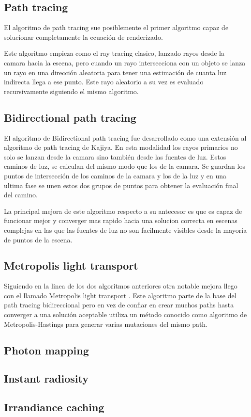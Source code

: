 \clearpage

\subsection{Path tracing}

El algoritmo de path tracing \cite{Kajiya1986} sue posiblemente el primer algoritmo capaz de solucionar completamente la ecuación de renderizado.

\medskip
Este algoritmo empieza como el ray tracing clasico, lanzado rayos desde la camara hacia la escena, pero cuando un rayo intersecciona con un objeto se lanza un rayo en una dirección aleatoria para tener una estimación de cuanta luz indirecta llega a ese punto. Este rayo aleatorio a su vez es evaluado recursivamente siguiendo el mismo algoritmo.  

\subsection{Bidirectional path tracing}

El algoritmo de Bidirectional path tracing \cite{Lafortune1993} fue desarrollado como una extensión al algoritmo de path tracing de Kajiya. En esta modalidad los rayos primarios no solo se lanzan desde la camara sino también desde las fuentes de luz. Estos caminos de luz, se calculan del mismo modo que los de la camara. Se guardan los puntos de intersección de los caminos de la camara y los de la luz y en una ultima fase se unen estos dos grupos de puntos para obtener la evaluación final del camino.

\medskip
La principal mejora de este algoritmo respecto a su antecesor es que es capaz de funcionar mejor y converger mas rapido hacia una solucion correcta en escenas complejas en las que las fuentes de luz no son facilmente visibles desde la mayoria de puntos de la escena.

\subsection{Metropolis light transport}

Siguiendo en la linea de los dos algoritmos anteriores otra notable mejora llego con el llamado Metropolis light transport \cite{Veach1997}. Este algoritmo parte de la base del path tracing bidireccional pero en vez de confiar en crear muchos paths hasta converger a una solución aceptable utiliza un método conocido como algoritmo de Metropolis-Hastings para generar varias mutaciones del mismo path. 

\subsection{Photon mapping}

\subsection{Instant radiosity}

\subsection{Irrandiance caching}
